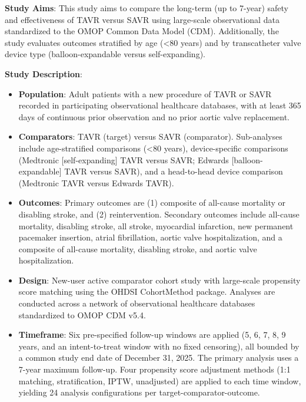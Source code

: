 \documentclass[
  12pt,
]{article}
\begin{document}
\textbf{Study Aims}: This study aims to compare the long-term (up to
7-year) safety and effectiveness of TAVR versus SAVR using large-scale
observational data standardized to the OMOP Common Data Model (CDM).
Additionally, the study evaluates outcomes stratified by age
(\textless80 years) and by transcatheter valve device type
(balloon-expandable versus self-expanding).

\textbf{Study Description}:

\begin{itemize}
\item
  \textbf{Population}: Adult patients with a new procedure of TAVR or
  SAVR recorded in participating observational healthcare databases,
  with at least 365 days of continuous prior observation and no prior
  aortic valve replacement.
\item
  \textbf{Comparators}: TAVR (target) versus SAVR (comparator).
  Sub-analyses include age-stratified comparisons (\textless80 years),
  device-specific comparisons (Medtronic {[}self-expanding{]} TAVR
  versus SAVR; Edwards {[}balloon-expandable{]} TAVR versus SAVR), and a
  head-to-head device comparison (Medtronic TAVR versus Edwards TAVR).
\item
  \textbf{Outcomes}: Primary outcomes are (1) composite of all-cause
  mortality or disabling stroke, and (2) reintervention. Secondary
  outcomes include all-cause mortality, disabling stroke, all stroke,
  myocardial infarction, new permanent pacemaker insertion, atrial
  fibrillation, aortic valve hospitalization, and a composite of
  all-cause mortality, disabling stroke, and aortic valve
  hospitalization.
\item
  \textbf{Design}: New-user active comparator cohort study with
  large-scale propensity score matching using the OHDSI CohortMethod
  package. Analyses are conducted across a network of observational
  healthcare databases standardized to OMOP CDM v5.4.
\item
  \textbf{Timeframe}: Six pre-specified follow-up windows are applied
  (5, 6, 7, 8, 9 years, and an intent-to-treat window with no fixed
  censoring), all bounded by a common study end date of December 31,
  2025. The primary analysis uses a 7-year maximum follow-up. Four
  propensity score adjustment methods (1:1 matching, stratification,
  IPTW, unadjusted) are applied to each time window, yielding 24
  analysis configurations per target-comparator-outcome.
\end{itemize}

\clearpage
\end{document}
